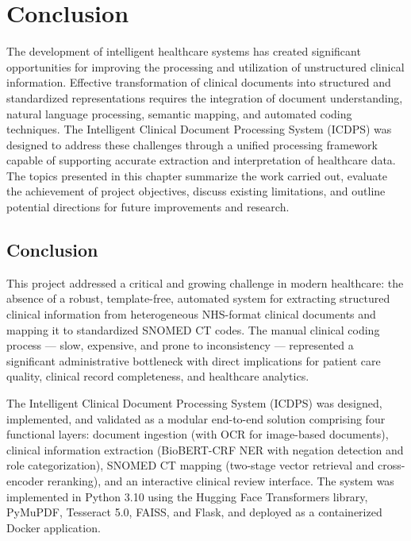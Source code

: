 \chapter{Conclusion}

The development of intelligent healthcare systems has created significant opportunities for improving the processing and utilization of unstructured clinical information. Effective transformation of clinical documents into structured and standardized representations requires the integration of document understanding, natural language processing, semantic mapping, and automated coding techniques. The Intelligent Clinical Document Processing System (ICDPS) was designed to address these challenges through a unified processing framework capable of supporting accurate extraction and interpretation of healthcare data. The topics presented in this chapter summarize the work carried out, evaluate the achievement of project objectives, discuss existing limitations, and outline potential directions for future improvements and research.

\section{Conclusion}

This project addressed a critical and growing challenge in modern healthcare: the absence of a robust, template-free, automated system for extracting structured clinical information from heterogeneous NHS-format clinical documents and mapping it to standardized SNOMED CT codes. The manual clinical coding process --- slow, expensive, and prone to inconsistency --- represented a significant administrative bottleneck with direct implications for patient care quality, clinical record completeness, and healthcare analytics.

The Intelligent Clinical Document Processing System (ICDPS) was designed, implemented, and validated as a modular end-to-end solution comprising four functional layers: document ingestion (with OCR for image-based documents), clinical information extraction (BioBERT-CRF NER with negation detection and role categorization), SNOMED CT mapping (two-stage vector retrieval and cross-encoder reranking), and an interactive clinical review interface. The system was implemented in Python 3.10 using the Hugging Face Transformers library, PyMuPDF, Tesseract 5.0, FAISS, and Flask, and deployed as a containerized Docker application.

